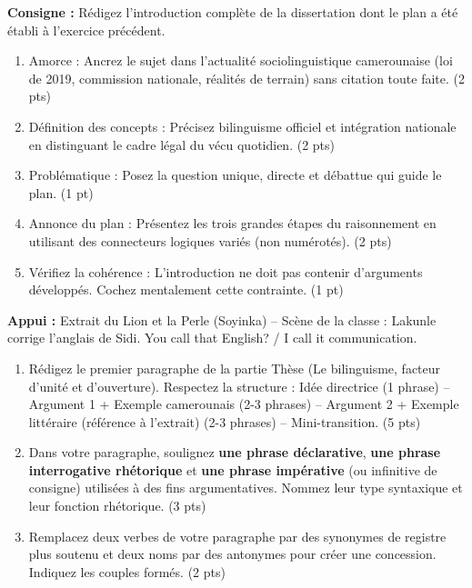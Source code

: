 \documentclass[11pt]{article}
\begin{document}
\begin{exercice}
\textbf{Consigne :} Rédigez l'introduction complète de la dissertation dont le plan a été établi à l'exercice précédent.

\begin{enumerate}
    \item Amorce : Ancrez le sujet dans l'actualité sociolinguistique camerounaise (loi de 2019, commission nationale, réalités de terrain) sans citation toute faite. (2 pts)
    \item Définition des concepts : Précisez \og bilinguisme officiel \fg{} et \og intégration nationale \fg{} en distinguant le cadre légal du vécu quotidien. (2 pts)
    \item Problématique : Posez la question unique, directe et débattue qui guide le plan. (1 pt)
    \item Annonce du plan : Présentez les trois grandes étapes du raisonnement en utilisant des connecteurs logiques variés (non numérotés). (2 pts)
    \item Vérifiez la cohérence : L'introduction ne doit pas contenir d'arguments développés. Cochez mentalement cette contrainte. (1 pt)
\end{enumerate}
\end{exercice}

\begin{exercice}
\textbf{Appui :} Extrait du \og Lion et la Perle \fg{} (Soyinka) -- Scène de la classe : Lakunle corrige l'anglais de Sidi. \og You call that English? \fg{} / \og I call it communication. \fg{}

\begin{enumerate}
    \item Rédigez le premier paragraphe de la partie \og Thèse \fg{} (Le bilinguisme, facteur d'unité et d'ouverture). Respectez la structure : Idée directrice (1 phrase) -- Argument 1 + Exemple camerounais (2-3 phrases) -- Argument 2 + Exemple littéraire (référence à l'extrait) (2-3 phrases) -- Mini-transition. (5 pts)
    \item Dans votre paragraphe, soulignez \textbf{une phrase déclarative}, \textbf{une phrase interrogative rhétorique} et \textbf{une phrase impérative} (ou infinitive de consigne) utilisées à des fins argumentatives. Nommez leur type syntaxique et leur fonction rhétorique. (3 pts)
    \item Remplacez deux verbes de votre paragraphe par des synonymes de registre plus soutenu et deux noms par des antonymes pour créer une concession. Indiquez les couples formés. (2 pts)
\end{enumerate}
\end{exercice}
\end{document}
